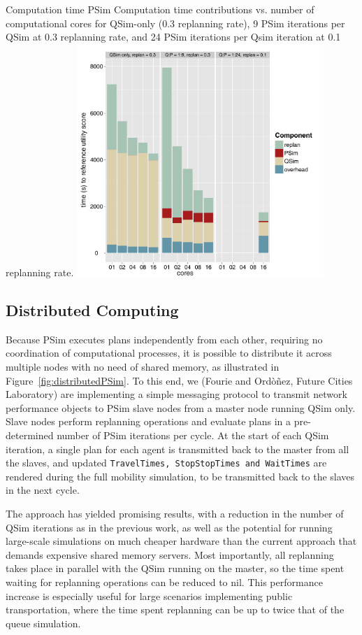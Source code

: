 \createfigure%
{Computation time PSim}%
{Computation time contributions vs. number of computational cores for QSim-only (0.3 replanning rate), 9 PSim iterations per QSim at 0.3 replanning rate, and 24 PSim iterations per Qsim iteration at 0.1 replanning rate.}%
{\label{fig:PSimPerformance}}%
{\includegraphics[width=0.7\textwidth, angle=0]{extending/figures/PSim/times}}%
{}

\subsection{Distributed Computing}
Because PSim executes plans independently from each other, requiring no coordination of computational processes, it is possible to distribute it across multiple nodes with no need of shared memory, as illustrated in Figure~\ref{fig:distributedPSim}. To this end,  we (Fourie and Ord\`o\~nez, Future Cities Laboratory) are implementing a simple messaging protocol to transmit network performance objects to PSim slave nodes from a master node running QSim only. Slave nodes perform replanning operations and evaluate plans in a pre-determined number of PSim iterations per cycle. At the start of each QSim iteration, a single plan for each agent is transmitted back to the master from all the slaves, and updated \lstinline|TravelTimes, StopStopTimes and WaitTimes| are rendered during the full mobility simulation, to be transmitted back to the slaves in the next cycle.

The approach has yielded promising results, with a reduction in the number of QSim iterations as in the previous work, as well as the potential for running large-scale simulations on much cheaper hardware than the current approach that demands expensive shared memory servers. Most importantly, all replanning takes place in parallel with the QSim running on the master, so the time spent waiting for replanning operations can be reduced to nil. This performance increase is especially useful for large scenarios implementing public transportation, where the time spent replanning can be up to twice that of the queue simulation.


